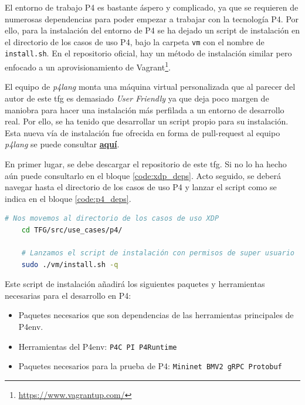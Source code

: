 El entorno de trabajo P4 es bastante áspero y complicado, ya que se requieren de numerosas dependencias para poder empezar a trabajar con la tecnología P4. Por ello, para la instalación del entorno de P4 se ha dejado un script de instalación en el directorio de los casos de uso P4, bajo la carpeta \texttt{vm} con el nombre de \texttt{install.sh}. En el repositorio oficial, hay un método de instalación similar pero enfocado a un aprovisionamiento de Vagrant\footnote{\url{https://www.vagrantup.com/}}. \\
\par
El equipo de \textit{p4lang} monta una máquina virtual personalizada que al parecer del autor de este \gls{tfg} es demasiado \textit{User Friendly} ya que deja poco margen de maniobra para hacer una instalación más perfilada a un entorno de desarrollo real. Por ello, se ha tenido que desarrollar un script propio para su instalación. Esta nueva vía de instalación fue ofrecida en forma de pull-request al equipo \textit{p4lang} se puede consultar \href{https://github.com/p4lang/tutorials/pull/261}{\textbf{aquí}}.\\
\par

En primer lugar, se debe descargar el repositorio de este \gls{tfg}. Si no lo ha hecho aún puede consultarlo en el bloque \ref{code:xdp_deps}. Acto seguido, se deberá navegar hasta el directorio de los casos de uso P4 y lanzar el script como se indica en el bloque \ref{code:p4_deps}.

\begin{lstlisting}[language= bash, style=Consola, caption={Instalación de dependencias P4},label=code:p4_deps]
    # Nos movemos al directorio de los casos de uso XDP
    cd TFG/src/use_cases/p4/
    
    # Lanzamos el script de instalación con permisos de super usuario
    sudo ./vm/install.sh -q
\end{lstlisting}

Este script de instalación añadirá los siguientes paquetes y herramientas necesarias para el desarrollo en P4:

\begin{itemize}
    \item Paquetes necesarios que son dependencias de las herramientas principales de P4env. 
    \item Herramientas del P4env: \texttt{P4C PI P4Runtime}
    \item Paquetes necesarios para la prueba de P4: \texttt{Mininet BMV2 gRPC Protobuf}
\end{itemize}


